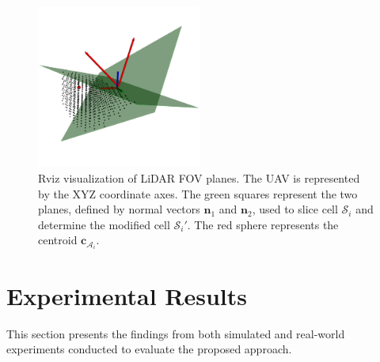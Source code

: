             \begin{figure}[H]
                \centering
                \includegraphics[width=0.48\textwidth]{./fig/rviz/cell_a_sliced_with_planes.png}
                \caption{
                    Rviz visualization of \ac{LiDAR} \ac{FOV} planes. The \ac{UAV} is represented by the XYZ coordinate axes. 
                    The green squares represent the two planes, defined by normal vectors $\mathbf{n}_1$ and $\mathbf{n}_2$, used to slice cell $\mathcal{S}_i$ and determine the modified cell $\mathcal{S}_i'$.
                    The red sphere represents the centroid $\mathbf{c}_{\mathcal{A}_i}$.
                }
                \label{fig:cell_a_sliced}
            \end{figure}
    
    \section{Experimental Results}
    \label{sec:experimental_results}
        This section presents the findings from both simulated and real-world experiments conducted to evaluate the proposed approach.
